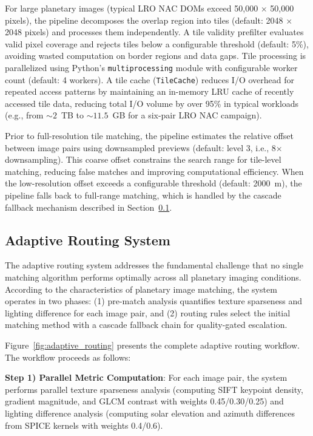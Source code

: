 \documentclass[lettersize,journal]{IEEEtran}
\begin{document}
For large planetary images (typical LRO NAC DOMs exceed 50,000 $\times$ 50,000 pixels), the pipeline decomposes the overlap region into tiles (default: 2048 $\times$ 2048 pixels) and processes them independently. A tile validity prefilter evaluates valid pixel coverage and rejects tiles below a configurable threshold (default: 5\%), avoiding wasted computation on border regions and data gaps. Tile processing is parallelized using Python's \texttt{multiprocessing} module with configurable worker count (default: 4 workers). A tile cache (\texttt{TileCache}) reduces I/O overhead for repeated access patterns by maintaining an in-memory LRU cache of recently accessed tile data, reducing total I/O volume by over 95\% in typical workloads (e.g., from ${\sim}2$~TB to ${\sim}11.5$~GB for a six-pair LRO NAC campaign).

Prior to full-resolution tile matching, the pipeline estimates the relative offset between image pairs using downsampled previews (default: level 3, i.e., 8$\times$ downsampling). This coarse offset constrains the search range for tile-level matching, reducing false matches and improving computational efficiency. When the low-resolution offset exceeds a configurable threshold (default: 2000~m), the pipeline falls back to full-range matching, which is handled by the cascade fallback mechanism described in Section~\ref{sec:adaptive_routing}.

\subsection{Adaptive Routing System}\label{sec:adaptive_routing}

The adaptive routing system addresses the fundamental challenge that no single matching algorithm performs optimally across all planetary imaging conditions. According to the characteristics of planetary image matching, the system operates in two phases: (1) pre-match analysis quantifies texture sparseness and lighting difference for each image pair, and (2) routing rules select the initial matching method with a cascade fallback chain for quality-gated escalation.

Figure~\ref{fig:adaptive_routing} presents the complete adaptive routing workflow. The workflow proceeds as follows:

\textbf{Step 1) Parallel Metric Computation}: For each image pair, the system performs parallel texture sparseness analysis (computing SIFT keypoint density, gradient magnitude, and GLCM contrast with weights 0.45/0.30/0.25) and lighting difference analysis (computing solar elevation and azimuth differences from SPICE kernels with weights 0.4/0.6).
\end{document}
